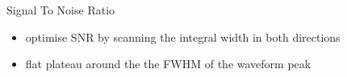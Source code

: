 \begin{frame}{Signal To Noise Ratio}
	
	\begin{figure}\vspace*{-15pt}
		\centering
	\end{figure}
	
	\begin{itemize}\itemfill
		\item optimise SNR by scanning the integral width in both directions
		\item flat plateau around the the FWHM of the waveform peak
	\end{itemize}
 
\end{frame}
